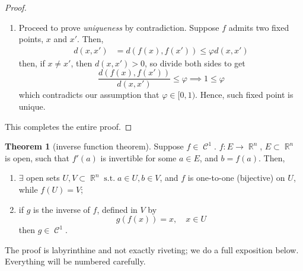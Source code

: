 \documentclass{amsart} %
\theoremstyle{mytheoremstyle}
\theoremstyle{definition}
\newtheorem{theorem}[definition]{Theorem}
\numberwithin{equation}{section}
\DeclareMathOperator{\R}{\mathbb{R}}
\DeclareMathOperator{\1}{\mathbbm{1}}
\DeclareMathOperator{\suchthat}{\text{ s.t. }}
\DeclareMathOperator{\contf}{\mathcal{C}}
\renewcommand{\leq}{\leqslant}
\renewcommand{\leq}{\leqslant}
\begin{document}
\begin{proof}
\begin{enumerate}[label=(\arabic*)]
		\item 
		Proceed to prove \textit{uniqueness} by contradiction. Suppose $f$ admits two fixed points, $x$ and $x'$. Then,
		\begin{align*}
		d(x,x') &= d(f(x),f(x')) \leq \varphi d(x ,x')
		\end{align*}
		then, if $x \neq x'$, then $d(x,x') > 0$, so divide both sides to get
		$$ \frac{d(f(x),f(x'))}{d(x ,x')} \leq \varphi \implies 1 \leq \varphi $$
		which contradicts our assumption that $\varphi \in [0,1)$. Hence, such fixed point is unique.
	\end{enumerate}
	This completes the entire proof.
\end{proof}

\begin{theorem}[inverse function theorem]
	\label{thminversefunction}
	Suppose $f \in \contf^1$. $f : E \to \R^n $, $E \subset \R^n$ is open, such that $f'(a)$ is invertible for some $a \in E$, and $b = f(a)$. Then,
	\begin{enumerate}[label=(\arabic*)]
		\item $\exists $ open sets $U, V \subset \R^n \suchthat a \in U, b \in V $, and $f$ is one-to-one (bijective) on $U$, while $f(U) =V$;
		\item if $g$ is the inverse of $f$, defined in $V$ by
		$$ g(f(x)) = x, \quad x \in U $$ 
		then $g \in \contf^1$.
	\end{enumerate}
\end{theorem}

The proof is labyrinthine and not exactly riveting; we do a full exposition below. Everything will be numbered carefully.
\end{document}
